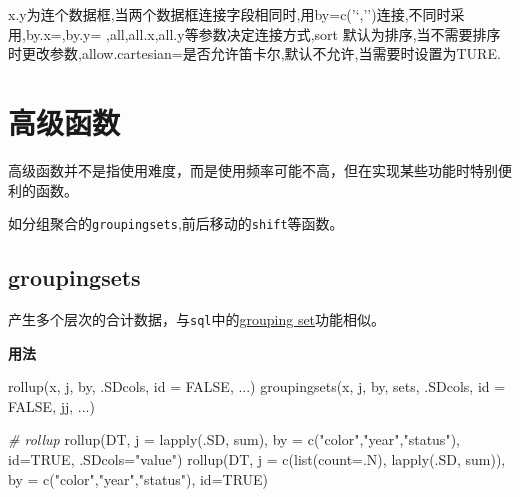 \documentclass[
]{book}
\newenvironment{Shaded}{\begin{snugshade}}{\end{snugshade}}
\newcommand{\AttributeTok}[1]{\textcolor[rgb]{0.77,0.63,0.00}{#1}}
\newcommand{\CommentTok}[1]{\textcolor[rgb]{0.56,0.35,0.01}{\textit{#1}}}
\newcommand{\ConstantTok}[1]{\textcolor[rgb]{0.00,0.00,0.00}{#1}}
\newcommand{\FunctionTok}[1]{\textcolor[rgb]{0.00,0.00,0.00}{#1}}
\newcommand{\NormalTok}[1]{#1}
\newcommand{\StringTok}[1]{\textcolor[rgb]{0.31,0.60,0.02}{#1}}
\begin{document}
x.y为连个数据框,当两个数据框连接字段相同时,用by=c('`,'')连接,不同时采用,by.x=,by.y= ,all,all.x,all.y等参数决定连接方式,sort 默认为排序,当不需要排序时更改参数,allow.cartesian=是否允许笛卡尔,默认不允许,当需要时设置为TURE.

\hypertarget{ux9ad8ux7ea7ux51fdux6570}{%
\section{高级函数}\label{ux9ad8ux7ea7ux51fdux6570}}

高级函数并不是指使用难度，而是使用频率可能不高，但在实现某些功能时特别便利的函数。

如分组聚合的\texttt{groupingsets},前后移动的\texttt{shift}等函数。

\hypertarget{groupingsets}{%
\subsection{groupingsets}\label{groupingsets}}

产生多个层次的合计数据，与\texttt{sql}中的\href{https://www.postgresql.org/docs/9.5/queries-table-expressions.html\#QUERIES-GROUPING-SETS}{grouping set}功能相似。

\textbf{用法}

\begin{Shaded}
\begin{Highlighting}[]
\FunctionTok{rollup}\NormalTok{(x, j, by, .SDcols, }\AttributeTok{id =} \ConstantTok{FALSE}\NormalTok{, ...)}
\FunctionTok{groupingsets}\NormalTok{(x, j, by, sets, .SDcols, }\AttributeTok{id =} \ConstantTok{FALSE}\NormalTok{, jj, ...)}

\CommentTok{\# rollup}
\FunctionTok{rollup}\NormalTok{(DT, }\AttributeTok{j =} \FunctionTok{lapply}\NormalTok{(.SD, sum), }\AttributeTok{by =} \FunctionTok{c}\NormalTok{(}\StringTok{"color"}\NormalTok{,}\StringTok{"year"}\NormalTok{,}\StringTok{"status"}\NormalTok{), }\AttributeTok{id=}\ConstantTok{TRUE}\NormalTok{, }\AttributeTok{.SDcols=}\StringTok{"value"}\NormalTok{)}
\FunctionTok{rollup}\NormalTok{(DT, }\AttributeTok{j =} \FunctionTok{c}\NormalTok{(}\FunctionTok{list}\NormalTok{(}\AttributeTok{count=}\NormalTok{.N), }\FunctionTok{lapply}\NormalTok{(.SD, sum)), }\AttributeTok{by =} \FunctionTok{c}\NormalTok{(}\StringTok{"color"}\NormalTok{,}\StringTok{"year"}\NormalTok{,}\StringTok{"status"}\NormalTok{), }\AttributeTok{id=}\ConstantTok{TRUE}\NormalTok{)}
\end{Highlighting}
\end{Shaded}
\end{document}

